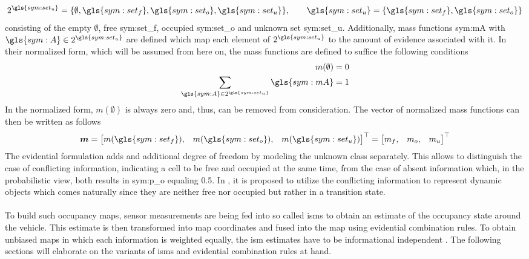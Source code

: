 \begin{align}
	2^{\gls{sym:set_u}} = \{\emptyset, \gls{sym:set_f}, \gls{sym:set_o}, \gls{sym:set_u}\}, \qquad \gls{sym:set_u} = \{\gls{sym:set_f}, \gls{sym:set_o}\}	
\end{align}
consisting of the empty $\emptyset$, free \gls{sym:set_f}, occupied \gls{sym:set_o} and unknown set \gls{sym:set_u}. Additionally, mass functions \gls{sym:mA} with $\gls{sym:A} \in 2^{\gls{sym:set_u}}$ are defined which map each element of $2^{\gls{sym:set_u}}$ to the amount of evidence associated with it. In their normalized form, which will be assumed from here on, the mass functions are defined to suffice the following conditions
\begin{align}
	\label{eq:evidential_norm}
	m(\emptyset) &= 0\\
	\sum_{\gls{sym:A} \in 2^{\gls{sym:set_u}}} \gls{sym:mA} &= 1
\end{align} 
In the normalized form, $m(\emptyset)$ is always zero and, thus, can be removed from consideration. The vector of normalized mass functions can then be written as follows
\begin{align}
	\vec{m} = \begin{bmatrix} m(\gls{sym:set_f}), & m(\gls{sym:set_o}), & m(\gls{sym:set_u}) \end{bmatrix}^{\top} = \begin{bmatrix} m_f, & m_o, & m_u \end{bmatrix}^{\top}
\end{align}
The evidential formulation adds and additional degree of freedom by modeling the unknown class separately. This allows to distinguish the case of conflicting information, indicating a cell to be free and occupied at the same time, from the case of absent information which, in the probabilistic view, both results in \gls{sym:p_o} equaling 0.5. In \cite{moras2011moving,yu2015evidential,kurdej2012map}, it is proposed to utilize the conflicting information to represent dynamic objects which comes naturally since they are neither free nor occupied but rather in a transition state.
\\\\
To build such occupancy maps, sensor measurements are being fed into so called \gls{ism}s to obtain an estimate of the occupancy state around the vehicle. This estimate is then transformed into map coordinates and fused into the map using evidential combination rules. To obtain unbiased maps in which each information is weighted equally, the \gls{ism} estimates have to be informational independent \cite{pagac1996evidential}. The following sections will elaborate on the variants of \gls{ism}s and evidential combination rules at hand.
%

